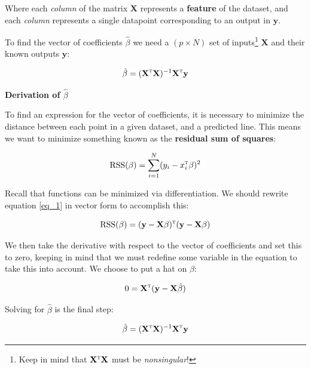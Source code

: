 \documentclass[a4paper,10pt,english]{book}
\newenvironment{boxquote}{
\begin{tcolorbox}[enhanced, colback=black!50!green!10!white, colframe=black, fuzzy shadow={0mm}{-4pt}{-0.5pt}{0.4mm}{black!60!white}]
\begin{center}}
{\end{center}\end{tcolorbox}}
\begin{document}
Where each \textit{column} of the matrix $\mathbf{X}$ represents a \textbf{feature}\label{vocab:feature0} of the dataset, and each \textit{column} represents a single datapoint corresponding to an output in $\mathbf{y}$.

To find the vector of coefficients $\hat{\beta}$ we need a $(p \times N)$ set of inputs\footnote{Keep in mind that $\mathbf{X}^\textsc{t} \mathbf{X}$ must be \textit{nonsingular}!} $\mathbf{X}$ and their known outputs $\mathbf{y}$:

\begin{equation}
\label{eq_0}
\hat{\beta} = ( \mathbf{X}^\textsc{t} \mathbf{X} )^{-1} \mathbf{X}^\textsc{t} \mathbf{y}
\end{equation}

\begin{boxquote}
\textbf{Derivation of $\hat{\beta}$}

To find an expression for the vector of coefficients, it is necessary to minimize the distance between each point in a given dataset, and a predicted line.  This means we want to minimize something known as the \textbf{residual sum of squares}\label{vocab:RSS0}:

\begin{equation}
\label{eq_1}
\text{RSS}(\beta) = \sum_{i=1}^{N} (y_i - x_i^\textsc{t} \beta )^2
\end{equation}

Recall that functions can be minimized via differentiation.  We should rewrite equation \ref{eq_1} in vector form to accomplish this:

\begin{equation*}
\text{RSS} (\beta) = (\mathbf{y} - \mathbf{X}\beta)^\textsc{t} (\mathbf{y} - \mathbf{X}\beta)
\end{equation*}

We then take the derivative with respect to the vector of coefficients and set this to zero, keeping in mind that we must redefine some variable in the equation to take this into account.  We choose to put a hat on $\beta$:

\begin{equation*}
0 = \mathbf{X}^\textsc{t} (\mathbf{y} - \mathbf{X} \hat{\beta} )
\end{equation*}

Solving for $\hat{\beta}$ is the final step:

\begin{equation*}
\hat{\beta} = (\mathbf{X}^\textsc{t} \mathbf{X})^{-1} \mathbf{X}^\textsc{t} \mathbf{y}
\end{equation*}

\end{boxquote}
\end{document}
